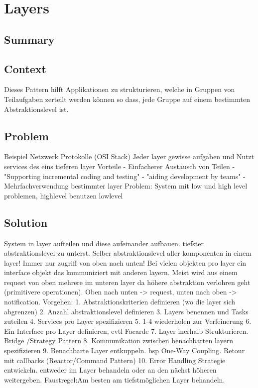 \chapter{Layers}

\section{Summary}

\section{Context}
Dieses Pattern hilft Applikationen zu strukturieren, welche in Gruppen von Teilaufgaben zerteilt werden können so dass, jede Gruppe auf einem bestimmten Abstraktionslevel ist.

\section{Problem}
Beispiel Netzwerk Protokolle (OSI Stack)
Jeder layer gewisse aufgaben und Nutzt services des eins tieferen layer
Vorteile
 - Einfacherer Austausch von Teilen
 - "Supporting incremental coding and testing"
 - "aiding development by teams"
 - Mehrfachverwendung bestimmter layer
Problem:
System mit low und high level problemen, highlevel benutzen lowlevel

\section{Solution}
System in layer aufteilen und diese aufeinander aufbauen. tiefster abstraktionslevel zu unterst. Selber abstraktionslevel aller komponenten in einem layer! Immer nur zugriff von oben nach unten!
Bei vielen objekten pro layer ein interface objekt das kommuniziert mit anderen layern. Meist wird aus einem request von oben mehrere im unteren layer da höhere abstraktion verlohren geht (primitivere operationen). Oben nach unten -> request, unten nach oben -> notification.
Vorgehen:
1. Abstraktionskriterien definieren (wo die layer sich abgrenzen)
2. Anzahl abstraktionslevel definieren
3. Layers benennen und Tasks zuteilen
4. Services pro Layer spezifizieren
5. 1-4 wiederholen zur Verfeinerung
6. Ein Interface pro Layer definieren, evtl Facarde
7. Layer inerhalb Strukturieren. Bridge /Strategy Pattern
8. Kommunikation zwischen benachbarten layern spezifizieren
9. Benachbarte Layer entkuppeln. bsp One-Way Coupling. Retour mit callbacks (Reactor/Command Pattern)
10. Error Handling Strategie entwickeln. entweder im Layer behandeln oder an den nächst höheren weitergeben. Faustregel:Am besten am tiefstmöglichen Layer behandeln.

